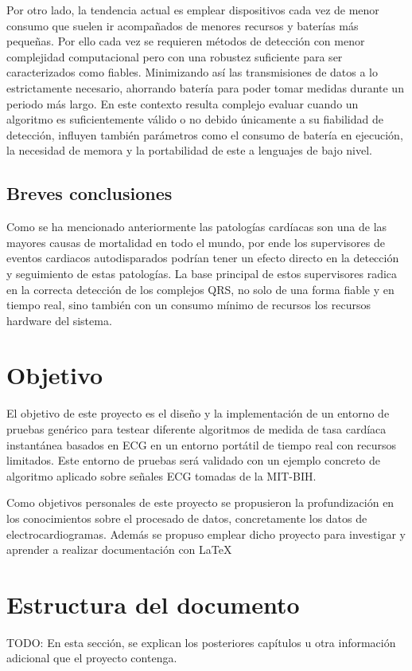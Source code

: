 Por otro lado, la tendencia actual es emplear dispositivos cada vez de menor consumo que suelen ir acompañados de menores recursos y baterías más pequeñas. Por ello cada vez se requieren métodos de detección con menor complejidad computacional pero con una robustez suficiente para ser caracterizados como fiables. Minimizando así las transmisiones de datos a lo estrictamente necesario, ahorrando batería para poder tomar medidas durante un periodo más largo. En este contexto resulta complejo evaluar cuando un algoritmo es suficientemente válido o no debido únicamente a su fiabilidad de detección, influyen también parámetros como el consumo de batería en ejecución, la necesidad de memora y la portabilidad de este a lenguajes de bajo nivel.

\subsection{Breves conclusiones}

Como se ha mencionado anteriormente las patologías cardíacas son una de las mayores causas de mortalidad en todo el mundo, por ende los supervisores de eventos cardiacos autodisparados podrían tener un efecto directo en la detección y seguimiento de estas patologías. La base principal de estos supervisores radica en la correcta detección de los complejos QRS, no solo de una forma fiable y en tiempo real, sino también con un consumo mínimo de recursos los recursos hardware del sistema.

\section{Objetivo}
El objetivo de este proyecto es el diseño y la implementación de un entorno de pruebas genérico para testear diferente algoritmos de medida de tasa cardíaca instantánea basados en ECG en un entorno portátil de tiempo real con recursos limitados. Este entorno de pruebas será validado con un ejemplo concreto de algoritmo aplicado sobre señales ECG tomadas de la MIT-BIH.

Como objetivos personales de este proyecto se propusieron la profundización en los conocimientos sobre el procesado de datos, concretamente los datos de electrocardiogramas. Además se propuso emplear dicho proyecto para investigar y aprender a realizar documentación con \LaTeX


\section{Estructura del documento}
TODO: En esta sección, se explican los posteriores capítulos u otra información adicional que el proyecto contenga.

\chapterend
